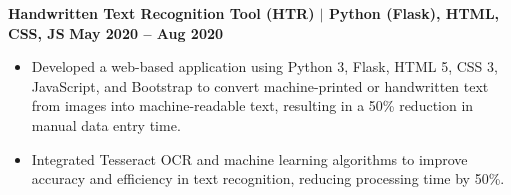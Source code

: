 \documentclass{article}
\begin{document}
\textbf{\textbf{Handwritten Text Recognition Tool (HTR) }  $\mid$ \textbf{Python (Flask), HTML, CSS, JS} } \hfill \textbf{\textbf{May 2020 – Aug 2020} }
\begin{itemize}[noitemsep,nolistsep,leftmargin=*]
    \item Developed a web-based application using Python 3, Flask, HTML 5, CSS 3, JavaScript, and Bootstrap to convert machine-printed or handwritten text from images into machine-readable text, resulting in a 50\% reduction in manual data entry time.
    \item Integrated Tesseract OCR and machine learning algorithms to improve accuracy and efficiency in text recognition, reducing processing time by 50\%.
\end{itemize}


\end{document}
